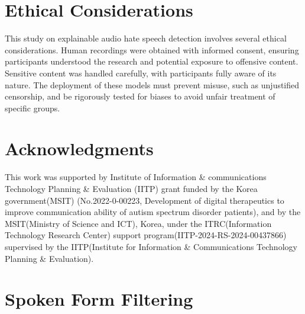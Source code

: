 \documentclass[11pt]{article}
\begin{document}
\section*{Ethical Considerations}

This study on explainable audio hate speech detection involves several ethical considerations. Human recordings were obtained with informed consent, ensuring participants understood the research and potential exposure to offensive content. Sensitive content was handled carefully, with participants fully aware of its nature. The deployment of these models must prevent misuse, such as unjustified censorship, and be rigorously tested for biases to avoid unfair treatment of specific groups.


\section*{Acknowledgments}
This work was supported by Institute of Information \& communications Technology Planning \& Evaluation (IITP) grant funded by the Korea government(MSIT) (No.2022-0-00223, Development of digital therapeutics to improve communication ability of autism spectrum disorder patients), and by the MSIT(Ministry of Science and ICT), Korea, under the ITRC(Information Technology Research Center) support program(IITP-2024-RS-2024-00437866) supervised by the IITP(Institute for Information \& Communications Technology Planning \& Evaluation).




%


\appendix

\section{Spoken Form Filtering}
\label{sec:PROMPTINGDETAILS}
\end{document}
